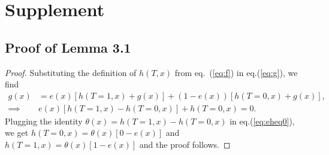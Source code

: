\documentclass[sigconf]{acmart}
\newcommand{\eat}[1]{}
\theoremstyle{plain}
\numberwithin{equation}{section}
\begin{document}
\eat{
\section*{Ethical Impact}
We strongly believe that our algorithm does not put any demographic to a systematic disadvantage. In fact, our scalable framework for determining causal impact can be used across multiple domains ranging from political science to epidemiology, for applications such as estimating/forecasting the impact of a disease outbreak, impact of socio-economic events on citizens, effect of political campaign strategies on voting decisions, etc. To the best of our knowledge our paper neither violates any ethical aspect, nor presents any adverse societal consequence.
 Causal impact estimation at average or individual unit level has been extensively studied and published by researchers and widely applied  In this work, we propose a new scalable framework for efficiently computing the treatment effect at a finer, individual unit level which is much more challenging compared to obtaining average treatment effect values.}




\newpage
\section{Supplement}
\subsection{Proof of Lemma 3.1}
\begin{proof}
Substituting the definition of $h(T,x)$ from eq.~(\ref{eq:f}) in eq.(\ref{eq:g}), we find
\begin{align}
g(x) &= e(x) \left[h(T=1,x)+g(x)\right] + \left(1-e(x)\right) \left[h(T=0, x)+ g(x)\right], \nonumber \\
\label{eq:eheq0}
\implies &e(x) \left[h(T=1,x) - h(T=0,x)\right] + h(T=0,x) = 0.
\end{align}
Plugging the identity $\theta(x) = h(T=1, x) - h(T=0, x)$ in eq.(\ref{eq:eheq0}), we get $h(T=0,x) = \theta(x) \left[0-e(x)\right]$ and $h(T=1,x) = \theta(x) \left[1-e(x)\right]$  and the proof follows.
\end{proof}
\end{document}
